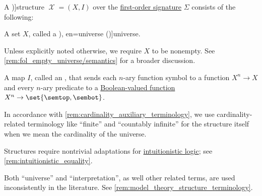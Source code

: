 \begin{definition}\label{def:fol_structure}
  A \term[en=structure (\cite[def. 2.1.15]{Hinman2005Logic})]{structure} \( \mscrX = (X, I) \) over the \hyperref[def:fol_signature]{first-order signature} \( \Sigma \) consists of the following:
  \begin{thmenum}
     A set \( X \), called a \term[ru=носитель (\cite[def. 2.2.4]{Герасимов2014Вычислимость}), en=universe (\cite[def. 2.1.15]{Hinman2005Logic})]{universe}.

    Unless explicitly noted otherwise, we require \( X \) to be nonempty. See \cref{rem:fol_empty_universe/semantics} for a broader discussion.

     A map \( I \), called an , that sends each \( n \)-ary function symbol to a function \( X^n \to X \) and every \( n \)-ary predicate to a \hyperref[def:boolean_function]{Boolean-valued function} \( X^n \to \set{ \semtop, \sembot } \).
  \end{thmenum}
\end{definition}
\begin{comments}
  \item In accordance with \cref{rem:cardinality_auxiliary_terminology}, we use cardinality-related terminology like \enquote{finite} and \enquote{countably infinite} for the structure itself when we mean the cardinality of the universe.

  \item Structures require nontrivial adaptations for \hyperref[con:intuitionistic_logic]{intuitionistic logic}; see \cref{rem:intuitionistic_equality}.

  \item Both \enquote{universe} and \enquote{interpretation}, as well other related terms, are used inconsistently in the literature. See \cref{rem:model_theory_structure_terminology}.
\end{comments}

